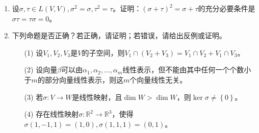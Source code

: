 \begin{enumerate}
    \item 设\(\sigma,\tau \in L(V,V),\sigma^2 = \sigma,\tau^2 = \tau\)。证明：\((\sigma + \tau)^2 = \sigma + \tau\)的充分必要条件是\(\sigma\tau = \tau\sigma = 0\)。

    \item 下列命题是否正确？若正确，请证明；若错误，请给出反例或证明。
          \begin{enumerate}
              \item[(1)] 设\(V_1,V_2,V_3\)是\(V\)的子空间，则\(V_1 \cap \left( V_2 + V_3 \right) = V_1 \cap V_2 + V_1 \cap V_3\)。
              \item[(2)] 设向量\(\beta\)可以由\(\alpha_1,\alpha_2,\ldots,\alpha_{m}\)线性表示，但不能由其中任何一个个数小于\(m\)的部分向量线性表示，则这\(m\)个向量线性无关。
              \item[(3)] 若\(\sigma:V \rightarrow W\)是线性映射，且\(\dim W > \dim W\)，则\(\ker\sigma \neq \left\{ 0 \right\}\)。
              \item[(4)] 存在线性映射\(\sigma:\mathbb{R}^2 \rightarrow \mathbb{R}^3\)，使得\(\sigma(1, - 1,1) = (1,0),\sigma(1,1,1) = (0,1)\)。
          \end{enumerate}
\end{enumerate}

\clearpage
